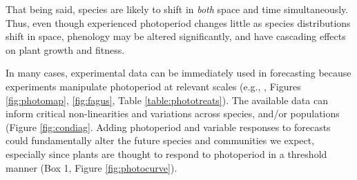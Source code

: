 \documentclass{article}
\begin{document}
That being said, species are likely to shift in \emph{both} space and time simultaneously. Thus, even though experienced photoperiod changes little as species distributions shift in space, phenology may be altered significantly, and have cascading effects on plant growth and fitness\citep{duputie2015}. %
\par In many cases, experimental data can be immediately used in forecasting because experiments manipulate photoperiod at relevant scales (e.g., \citet{Basler:2014aa,Heide:2015aa}, Figures \ref{fig:photomap}, \ref{fig:fagus}, Table \ref{table:phototreats}).  The available data can inform critical non-linearities and variations across species, and/or populations (Figure \ref{fig:condiag}.  Adding photoperiod and variable responses to forecasts could fundamentally alter the future species and communities we expect, especially since plants are thought to respond to photoperiod in a threshold manner (Box 1, Figure \ref {fig:photocurve}). 
\end{document}
